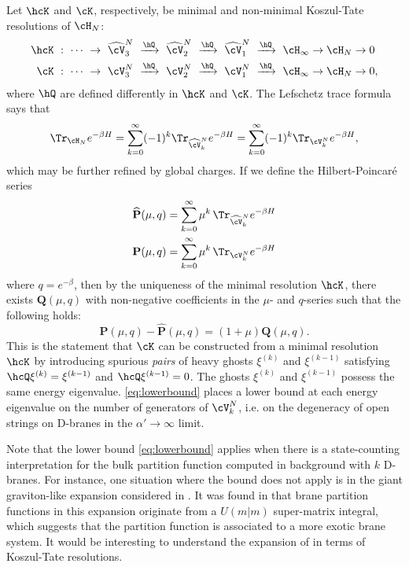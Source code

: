 \documentclass[a4paper,12pt]{article}
\begin{document}
Let $\hcK$ and $\cK$, respectively, be minimal and non-minimal Koszul-Tate resolutions of $\cH_N$:
\begin{align}
    \hcK \ &: \ \cdots \ \rightarrow \ \widehat\cV_3^{N} \ \xrightarrow{\hQ} \ \widehat\cV_2^{N} \ \xrightarrow{\hQ} \ \widehat\cV_1^{N} \ \xrightarrow{\hQ} \ \cH_\infty \rightarrow \cH_N \rightarrow 0 \nonumber \\
    \cK \ &: \ \cdots \ \rightarrow \ \cV_3^{N} \ \xrightarrow{\hQ} \ \cV_2^{N} \ \xrightarrow{\hQ} \ \cV_1^{N} \ \xrightarrow{\hQ} \ \cH_\infty \rightarrow \cH_N \rightarrow 0,
\end{align}
where $\hQ$ are defined differently in $\hcK$ and $\cK$. The Lefschetz trace formula says that
\begin{equation}
\Tr_{\cH_N} e^{-\beta H} = \sum_{k=0}^\infty (-1)^k \Tr_{\widehat\cV_k^N} e^{-\beta H} = \sum_{k=0}^\infty (-1)^k \Tr_{\cV_k^N} e^{-\beta H},
\end{equation}
which may be further refined by global charges. If we define the Hilbert-Poincar\'{e} series
\begin{align}
    \widehat{\mathbf{P}}(\mu, q) &= \sum_{k=0}^\infty \mu^k \, \Tr_{\widehat\cV_k^N} e^{-\beta H} \nonumber \\
    \mathbf{P}(\mu, q) &= \sum_{k=0}^\infty \mu^k \, \Tr_{\cV_k^N} e^{-\beta H}
\end{align}
where $q = e^{-\beta}$, then by the uniqueness of the minimal resolution $\hcK$, there exists $\mathbf{Q}(\mu,q)$ with non-negative coefficients in the $\mu$- and $q$-series such that the following holds:
\begin{equation} \label{eq:lowerbound}
\mathbf{P}(\mu, q) - \widehat{\mathbf{P}}(\mu, q) = (1 + \mu) \mathbf{Q}(\mu, q).
\end{equation}
This is the statement that $\cK$ can be constructed from a minimal resolution $\hcK$ by introducing spurious \textit{pairs} of heavy ghosts $\xi^{(k)}$ and $\xi^{(k-1)}$ satisfying $\hcQ \xi^{(k)} = \xi^{(k-1)}$ and $\hcQ \xi^{(k-1)} = 0$. The ghosts $\xi^{(k)}$ and $\xi^{(k-1)}$ possess the same energy eigenvalue. \eqref{eq:lowerbound} places a lower bound at each energy eigenvalue on the number of generators of $\cV_k^N$, i.e. on the degeneracy of open strings on D-branes in the $\alpha' \to \infty$ limit.

Note that the lower bound \eqref{eq:lowerbound} applies when there is a state-counting interpretation for the bulk partition function computed in background with $k$ D-branes. For instance, one situation where the bound does not apply is in the giant graviton-like expansion considered in \cite{Murthy:2022ien}. It was found in \cite{Eniceicu:2023uvd} that brane partition functions in this expansion originate from a $U(m|m)$ super-matrix integral, which suggests that the partition function is associated to a more exotic brane system. It would be interesting to understand the expansion of \cite{Murthy:2022ien} in terms of Koszul-Tate resolutions.
\end{document}

